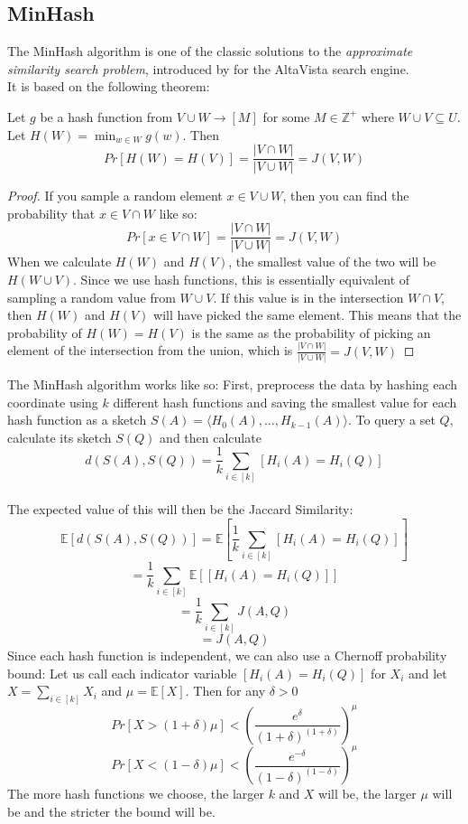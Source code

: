 \subsection{MinHash}
The MinHash algorithm is one of the classic solutions to the \textit{approximate similarity search problem}, introduced by \citet{broder1997minhash} for the AltaVista search engine.\\
It is based on the following theorem:
\begin{theorem}
    \label{thm:minhash}
    Let $g$ be a hash function from $V \cup W \rightarrow [M]$ for some $M \in \mathbb{Z}^+$ where $W\cup V\subseteq U$. Let $H(W)=\min_{w\in W} g(w)$. Then
    $$Pr[H(W)=H(V)]=\frac{|V\cap W|}{|V \cup W|}= J(V,W)$$
\end{theorem}
\begin{proof}
    If you sample a random element $x \in V \cup W$, then you can find the probability that $x \in V\cap W$ like so:
    $$Pr[x\in V \cap W]=\frac{|V\cap W|}{|V \cup W|}= J(V,W)$$
    When we calculate $H(W)$ and $H(V)$, the smallest value of the two will be $H(W\cup V)$. Since we use hash functions, this is essentially equivalent of sampling a random value from $W\cup V$. If this value is in the intersection $W\cap V$, then $H(W)$ and $H(V)$ will have picked the same element. This means that the probability of $H(W)=H(V)$ is the same as the probability of picking an element of the intersection from the union, which is $\frac{|V\cap W|}{|V\cup W|}=J(V,W)$
\end{proof}
The MinHash algorithm works like so: First, preprocess the data by hashing each coordinate using $k$ different hash functions and saving the smallest value for each hash function as a sketch $S(A)=\langle H_0(A), \dots, H_{k-1}(A)\rangle$.
To query a set $Q$, calculate its sketch $S(Q)$ and then calculate $$d(S(A),S(Q))=\frac{1}{k}\sum_{i\in [k]}[H_i(A)=H_i(Q)]$$\\
The expected value of this will then be the Jaccard Similarity:
$$\mathbb{E}[d(S(A),S(Q))]=\mathbb{E}[\frac{1}{k}\sum_{i\in [k]}[H_i(A)=H_i(Q)]]$$
$$=\frac{1}{k}\sum_{i\in [k]}\mathbb{E}[[H_i(A)=H_i(Q)]]$$
$$=\frac{1}{k}\sum_{i\in [k]}J(A,Q)$$
$$=J(A,Q)$$
Since each hash function is independent, we can also use a Chernoff probability bound: Let us call each indicator variable $[H_i(A)=H_i(Q)]$ for $X_i$ and let $X=\sum_{i\in [k]}X_i$ and $\mu = \mathbb{E}[X]$. Then for any $\delta > 0$
$$Pr[X > (1+\delta)\mu] < \left(\frac{e^\delta}{(1+\delta)^{(1+\delta)}}\right)^\mu$$
$$Pr[X < (1-\delta)\mu] < \left(\frac{e^{-\delta}}{(1-\delta)^{(1-\delta)}}\right)^\mu$$
The more hash functions we choose, the larger $k$ and $X$ will be, the larger $\mu$ will be and the stricter the bound will be. 
